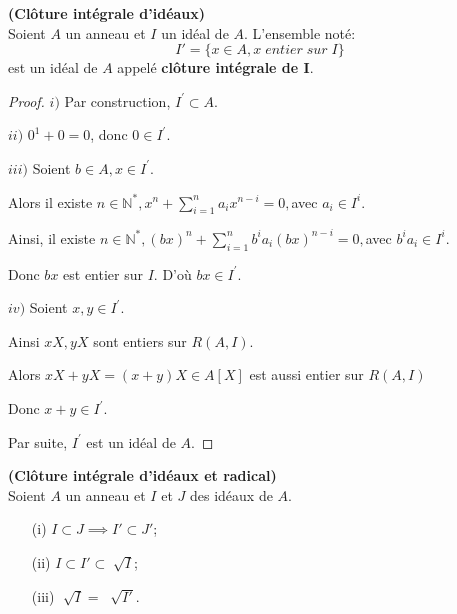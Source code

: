 \begin{moncorollaire}\textbf{(Clôture intégrale d'idéaux)}\cite{Di2}\\
	Soient $A$ un anneau et $I$ un idéal de $A$.
	L'ensemble noté: 
	\[ I'=\{x \in A, x \; entier \; sur \; I \} \]
	est un idéal de $A$ appelé \textbf{clôture intégrale de I}.
\end{moncorollaire}
\begin{proof}
	
	$i)$ Par construction, $I^{\prime }\subset A.$
	
	$ii)$ $0^{1}+0=0$, donc $0\in I^{\prime }.$
	
	$iii)$ Soient $b\in A,x\in I^{\prime }.$
	
	Alors il existe $n\in \mathbb{N}^{\ast },x^{n}+\sum\limits_{i=1}^{n}a_{i}x^{n-i}=0,$avec $a_{i}\in I^{i}.$
	
	Ainsi, il existe $n\in \mathbb{N}^{\ast },(bx)^{n}+\sum\limits_{i=1}^{n}b^{i}a_{i}(bx)^{n-i}=0,$avec $
	b^{i}a_{i}\in I^{i}.$
	
	Donc $bx$ est entier sur $I.$ D'où $bx\in I^{\prime }.$
	
	$iv)$ Soient $x,y\in I^{\prime }.$
	
	Ainsi $xX,yX$ sont entiers sur $R(A,I).$
	
	Alors $xX+yX=(x+y)X\in A[X]$ est aussi entier sur $R(A,I)$
	
	Donc $x+y\in I^{\prime }.$
	
	Par suite, $I^{\prime }$ est un idéal de $A.$
\end{proof}
\begin{maremarque}\textbf{(Clôture intégrale d'idéaux et radical)}\cite{Di2} \\
	Soient $A$ un anneau et $I$ et $J$ des idéaux de $A$.
	\begin{enumerate}
		\item[(i)]$I \subset J \implies I' \subset J' $;
		\item[(ii)]$I \subset I' \subset \sqrt[]{I} $;
		\item[(iii)]$\sqrt[]{I} = \; \sqrt[]{I'} $.
	\end{enumerate}
\end{maremarque}
